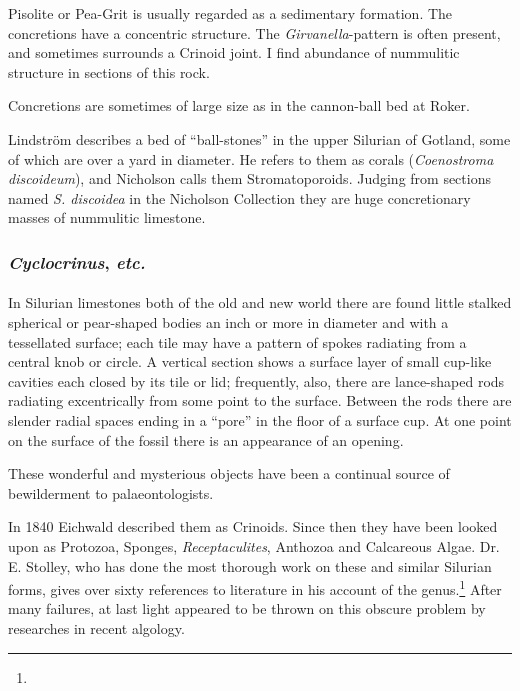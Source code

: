 \documentclass[a4paper, 12pt, oneside]{article}
\begin{document}
Pisolite or Pea-Grit is usually regarded as a sedimentary formation. The concretions have a concentric structure. The \emph{Girvanella}-pattern is often present, and sometimes surrounds a Crinoid joint. I find abundance of nummulitic structure in sections of this rock.

Concretions are sometimes of large size as in the cannon-ball bed at Roker.

Lindström describes a bed of ``ball-stones'' in the upper Silurian of Gotland, some of which are over a yard in diameter. He refers to them as corals (\emph{Coenostroma discoideum}), and Nicholson calls them Stromatoporoids. Judging from sections named \emph{S. discoidea} in the Nicholson Collection they are huge concretionary masses of nummulitic limestone.

\subsubsection{\emph{Cyclocrinus}, \emph{etc.}}
\paragraph{}
In Silurian limestones both of the old and new world there are found little stalked spherical or pear-shaped bodies an inch or more in diameter and with a tessellated surface; each tile may have a pattern of spokes radiating from a central knob or circle. A vertical section shows a surface layer of small cup-like cavities each closed by its tile or lid; frequently, also, there are lance-shaped rods radiating excentrically from some point to the surface. Between the rods there are slender radial spaces ending in a ``pore'' in the floor of a surface cup. At one point on the surface of the fossil there is an appearance of an opening.

These wonderful and mysterious objects have been a continual source of bewilderment to palaeontologists.

In 1840 Eichwald described them as Crinoids. Since then they have been looked upon as Protozoa, Sponges, \emph{Receptaculites}, Anthozoa and Calcareous Algae. Dr. E. Stolley, who has done the most thorough work on these and similar Silurian forms, gives over sixty references to literature in his account of the genus.\footnote{} After many failures, at last light appeared to be thrown on this obscure problem by researches in recent algology.
\end{document}
